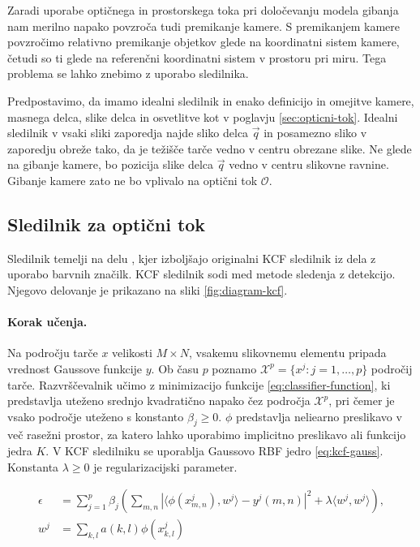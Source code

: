 {Zaradi uporabe optičnega in prostorskega toka pri določevanju modela gibanja nam merilno napako povzroča tudi premikanje kamere. S premikanjem kamere povzročimo relativno premikanje objetkov glede na koordinatni sistem kamere, četudi so ti glede na referenčni koordinatni sistem v prostoru pri miru. Tega problema se lahko znebimo z uporabo sledilnika. 

Predpostavimo, da imamo idealni sledilnik in enako definicijo in omejitve kamere, masnega delca, slike delca in osvetlitve kot v poglavju \ref{sec:opticni-tok}. Idealni sledilnik v vsaki sliki zaporedja najde sliko delca $\vec{q}$ in posamezno sliko v zaporedju obreže tako, da je težišče tarče vedno v centru obrezane slike. Ne glede na gibanje kamere, bo pozicija slike delca $\vec{q}$ vedno v centru slikovne ravnine. Gibanje kamere zato ne bo vplivalo na optični tok $\mathcal{O}$.



\subsection{Sledilnik za optični tok} 
Sledilnik temelji na delu \cite{danelljan2014adaptive}, kjer izboljšajo originalni KCF sledilnik iz dela \cite{henriques2012exploiting} z uporabo barvnih značilk. KCF sledilnik sodi med metode sledenja z detekcijo. Njegovo delovanje je prikazano na sliki \ref{fig:diagram-kcf}.

\paragraph{Korak učenja.}
Na področju tarče $x$ velikosti $M \times N$, vsakemu slikovnemu elementu pripada vrednost Gaussove funkcije $y$. Ob času $p$ poznamo $\mathcal{X}^p = \{x^j: j=1,\ldots,p\}$ področij tarče. Razvrščevalnik učimo z minimizacijo funkcije \eqref{eq:classifier-function}, ki predstavlja uteženo srednjo kvadratično napako čez področja $\mathcal{X}^p$, pri čemer je vsako področje uteženo s konstanto $\beta_j \geq 0$. $\phi$ predstavlja neliearno preslikavo v več rasežni prostor, za katero lahko uporabimo implicitno preslikavo ali funkcijo jedra $K$. V KCF sledilniku se uporablja Gaussovo RBF jedro \eqref{eq:kcf-gauss}. Konstanta $\lambda \geq 0$ je regularizacijski parameter.

\begin{equation}
\begin{aligned}
\epsilon &= \sum_{j=1}^p \beta_j \left( 
	\sum_{m,n} \left| \langle \phi\left(x_{m,n}^j \right), w^j \rangle - y^j(m,n) \right|^2
    + \lambda \langle w^j, w^j \rangle
\right), \\
w^j &= \sum_{k,l} a(k,l) \phi\left(x_{k,l}^j  \right)
\end{aligned}
\label{eq:classifier-function}
\end{equation}

}
